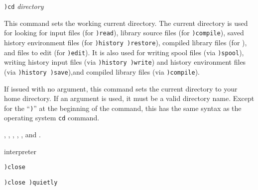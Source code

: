 \par{}
\begin{simpleList}
\item {\tt )cd} {\it directory}
\end{simpleList}

\par{}

This command sets the \Language{} working current directory.
The current directory is used for looking for
input files (for {\tt )read}),
\Language{} library source files (for {\tt )compile}),
saved history environment files (for {\tt )history )restore}),
compiled \Language{} library files (for ), and
files to edit (for {\tt )edit}).
It is also used for writing
spool files (via {\tt )spool}),
writing history input files (via {\tt )history )write}) and
history environment files (via {\tt )history )save}),and
compiled \Language{} library files (via {\tt )compile}).

If issued with no argument, this command sets the \Language{}
current directory to your home directory.
If an argument is used, it must be a valid directory name.
Except for the ``{\tt )}'' at the beginning of the command,
this has the same syntax as the operating system {\tt cd} command.

\par{}
,
,
,
,
, and
.



\par{} interpreter

\par{}
\begin{simpleList}
\item{\tt )close}
\item{\tt )close )quietly}
\end{simpleList}
\par{}

